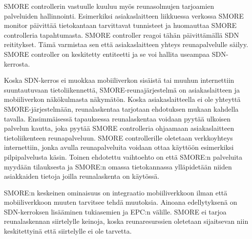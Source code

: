 SMORE controllerin vastuulle kuuluu myös reunasolmujen tarjoamien palveluiden hallinnointi. 
Esimerkiksi asiakaslaitteen liikkuessa verkossa SMORE monitor päivittää tietokantaan tarvittavat tunnisteet ja huomauttaa SMORE controlleria tapahtumasta. SMORE controller reagoi tähän päivittämällä SDN reititykset. Tämä varmistaa sen että asiakaslaitteen yhteys reunapalvelulle säilyy. SMORE controller on keskitetty entiteetti ja se voi hallita useampaa SDN-kerrosta.

Koska SDN-kerros ei muokkaa mobiiliverkon sisäistä tai muuhun  internettiin suuntautuvaan tietoliikennettä, SMORE-reunajärjestelmä on asiakaslaitteen ja mobiiliverkon näkökulmasta näkymätön.
Koska asiakaslaitteella ei ole yhteyttä SMORE-järjestelmään, reunalaskentaa tarjotaan ehdotuksen mukaan kahdella tavalla. Ensimmäisessä tapauksessa reunalaskentaa voidaan pyytää ulkoisen palvelun kautta, joka pyytää SMORE controlleria ohjaamaan asiakaslaitteen tietoliikenteen reunapalveluun.
SMORE controllerille oletetaan verkkoyhteys internettiin, jonka avulla reunapalveluita voidaan ottaa käyttöön esimerkiksi pilpipalvelusta käsin.
Toinen ehdotettu vaihtoehto on että SMORE:n palveluita myydään tilauksesta ja SMORE:n omassa tietokannassa ylläpidetään niiden asiakkaiden tietoja joilla reunalaskenta on käytössä. 

SMORE:n keskeinen ominaisuus on integraatio mobiiliverkkoon ilman että mobiiliverkkoon muuten tarvitsee tehdä muutoksia. Ainoana edellytyksenä on SDN-kerroksen lisääminen tukiasemien ja EPC:n välille. SMORE ei tarjoa reunalaskennan siirtelylle keinoja, koska reunaresurssien oletetaan sijaitsevan niin keskitettyinä että siirtelylle ei ole tarvetta.

